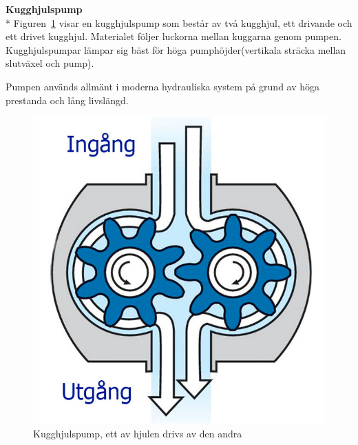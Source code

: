 \newpage
\textbf{Kugghjulspump}\\*
Figuren~\ref{kugghjulpump} visar en kugghjulspump som består av två kugghjul, ett drivande och ett drivet kugghjul.  Materialet följer luckorna mellan kuggarna genom pumpen. Kugghjulspumpar lämpar sig bäst för höga pumphöjder(vertikala sträcka mellan slutväxel och pump)\cite{kugghjul pump}.

Pumpen används allmänt i moderna hydrauliska system på grund av höga prestanda och lång livslängd.

\begin{figure}[h]
	\begin{center}
		\includegraphics[scale=0.25]{images/68637(1).jpg}
		\caption{Kugghjulspump, ett av hjulen drivs av den andra}
		\label{kugghjulpump}	
	\end{center}
\end{figure}